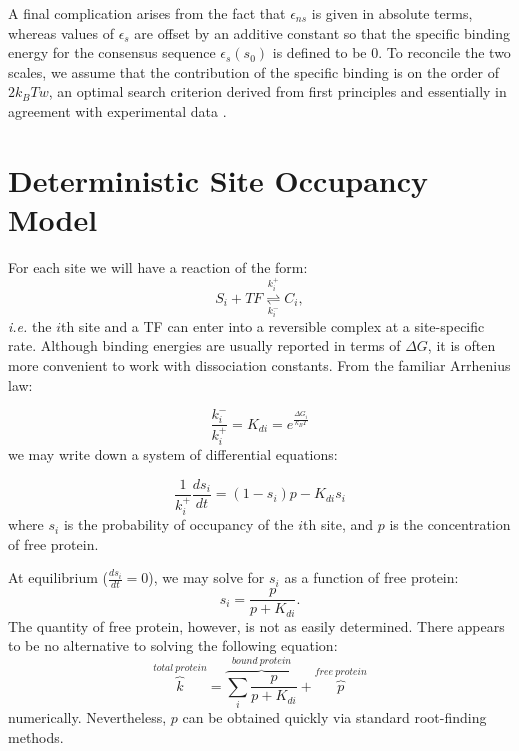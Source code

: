 \documentclass{article}
\begin{document}
  A final complication arises from the fact that $\epsilon_{ns}$ is
  given in absolute terms, whereas values of $\epsilon_s$ are offset
  by an additive constant so that the specific binding energy for the
  consensus sequence $\epsilon_s(s_0)$ is defined to be 0.  To
  reconcile the two scales, we assume that the contribution of the
  specific binding is on the order of $2k_BT w$, an optimal search
  criterion derived from first principles \cite{gerland02} and
  essentially in agreement with experimental data \cite{bakk2004}.
\section{Deterministic Site Occupancy Model}
For each site we will have a reaction of the form:
\begin{equation}
  \label{eq:s_reaction}
  S_i + TF \overset{k^+_i}{\underset{k^-_i}{\rightleftharpoons}} C_i,
\end{equation}
\textit{i.e.} the $i$th site and a TF can enter into a reversible
complex at a site-specific rate.  Although binding energies are
usually reported in terms of $\Delta G$, it is often more convenient
to work with dissociation constants.  From the familiar Arrhenius law:

\begin{equation}\label{eq:kd}
  \frac{k^-_i}{k^+_i} = K_{di} = e^{\frac{\Delta G_i}{k_BT}}
\end{equation}
we may write down a system of differential equations:

\begin{equation}
  \label{eq:s_diff}
  \frac{1}{k_i^+}\frac{ds_i}{dt} = (1-s_i)p - K_{di}s_i
\end{equation}
where $s_i$ is the probability of occupancy of the $i$th site, and $p$
is the concentration of free protein.

At equilibrium ($\frac{ds_i}{dt} = 0$), we may solve for $s_i$ as a
function of free protein:
\begin{equation}
  \label{eq:s_equilibrium}
  s_i = \frac{p}{p + K_{di}}.
\end{equation}
The quantity of free protein, however, is not as easily determined.
There appears to be no alternative to solving the following equation:
\begin{equation}
  \label{eq:p_numeric}
  \overset{total\ protein}{\overbrace{k}} = \overset{bound\ protein}{\overbrace{\displaystyle\sum_i\frac{p}{p + K_{di}}}} + \overset{free\ protein}{\overbrace{p}}
\end{equation}
numerically.  Nevertheless, $p$ can be obtained quickly via standard
root-finding methods.
\end{document}
